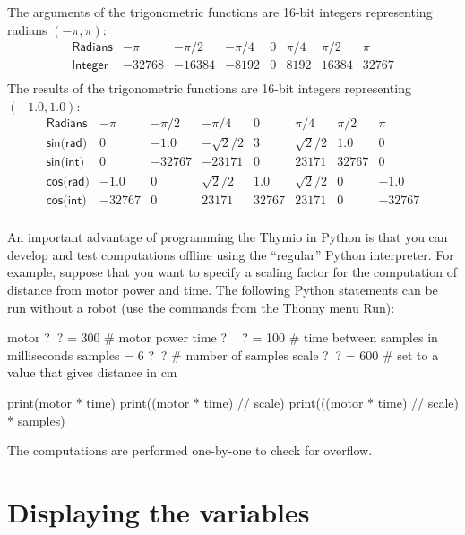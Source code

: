 \documentclass[11pt,a4paper]{article}
\newcommand*{\bu}[1]{\textsf{\small #1}}
\begin{document}
The arguments of the trigonometric functions are 16-bit integers representing radians $(-\pi,\pi)$:
\[
\renewcommand*{\arraystretch}{1.3}
\begin{array}{lccccccc}
\textsf{Radians}&-\pi&-\pi/2&-\pi/4&0&\pi/4&\pi/2&\pi\\\hline
\textsf{Integer}&-32768&-16384&-8192&0&8192&16384&32767\\
\end{array}
\]
The results of the trigonometric functions are 16-bit integers representing $(-1.0,1.0)$:
\[
\renewcommand*{\arraystretch}{1.3}
\begin{array}{lccccccc}
\textsf{Radians}&-\pi&-\pi/2&-\pi/4&0&\pi/4&\pi/2&\pi\\\hline
\textsf{sin(rad)} & 0 & -1.0 & -\sqrt{2}/{2} & 3 & \sqrt{2}/{2} & 1.0& 0\\
\textsf{sin(int)}&0&-32767&-23171&0&23171&32767&0\\\hline
\textsf{cos(rad)} & -1.0 & 0 & \sqrt{2}/{2} & 1.0 & \sqrt{2}/{2} & 0& -1.0\\
\textsf{cos(int)}&-32767&0&23171&32767&23171&0&-32767\\
\end{array}
\]

An important advantage of programming the Thymio in Python is that you can develop and test computations offline using the ``regular'' Python interpreter. For example, suppose that you want to specify a scaling factor for the computation of distance from motor power and time. The following Python statements can be run without a robot (use the commands from the Thonny menu \bu{Run}):

\newpage

\begin{prog}
motor  ?$\;\;$? = 300     # motor power
time   ?$\quad\:$? = 100    # time between samples in milliseconds
samples = 6      ?$\;\;$? # number of samples
scale  ?$\;\;$?  = 600    # set to a value that gives distance in cm

print(motor * time)
print((motor * time) // scale)
print(((motor * time) // scale) * samples)
\end{prog}
The computations are performed one-by-one to check for overflow.

\section{Displaying the variables}\label{s.variables}
\end{document}
